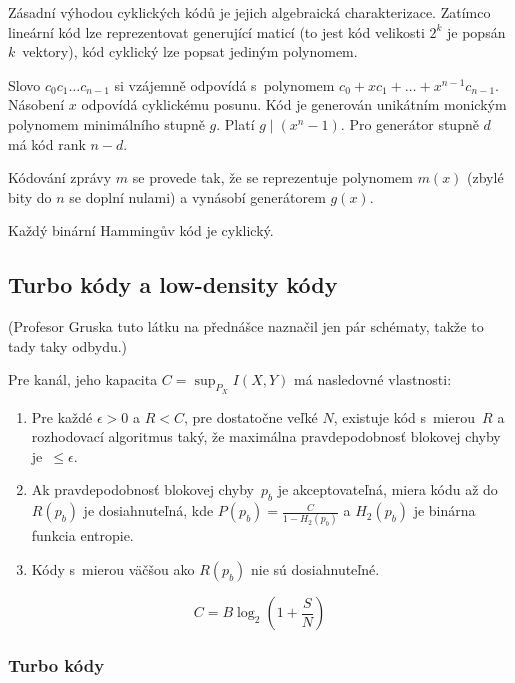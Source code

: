Zásadní výhodou cyklických kódů je jejich algebraická charakterizace.
Zatímco lineární kód lze reprezentovat generující maticí (to jest kód
velikosti $2^k$ je popsán $k$~vektory), kód cyklický lze popsat
jediným polynomem.

Slovo $c_0c_1 \ldots c_{n-1}$ si vzájemně odpovídá s~polynomem
$c_0 + x c_1 + \ldots + x^{n-1} c_{n-1}$. Násobení $x$ odpovídá
cyklickému posunu. Kód je generován unikátním monickým polynomem
minimálního stupně $g$. Platí $g \mid (x^n - 1)$.
Pro generátor stupně $d$ má kód rank $n - d$.

Kódování zprávy $m$ se provede tak, že se reprezentuje polynomem $m(x)$
(zbylé bity do $n$ se doplní nulami)
a vynásobí generátorem $g(x)$.

Každý binární Hammingův kód je cyklický.

\subsection{Turbo kódy a low-density kódy}

(Profesor Gruska tuto látku na přednášce naznačil jen pár schématy, takže
to tady taky odbydu.)

\begin{theorem}[Shannon]
	Pre kanál, jeho kapacita $C=\sup_{P_X}I(X,Y)$ má nasledovné vlastnosti:
	\begin{enumerate}
		\item Pre každé $\epsilon > 0$ a $R < C$, pre dostatočne veľké $N$, existuje
		kód s~mierou~$R$ a rozhodovací algoritmus taký, že maximálna pravdepodobnosť
		blokovej chyby je~$\leq \epsilon$.
		\item Ak pravdepodobnosť blokovej chyby~$p_b$ je akceptovateľná, miera
		kódu až do $R(p_b)$ je dosiahnuteľná, kde $P(p_b)=\frac{C}{1-H_2(p_b)}$ a
		$H_2(p_b)$ je binárna funkcia entropie.
		\item Kódy s~mierou väčšou ako $R(p_b)$ nie sú dosiahnuteľné.
	\end{enumerate}
\end{theorem}

\begin{theorem}[Shannon]
	\[ 
		C = B \log_2\left(1+\frac{S}{N}\right)
	\]
\end{theorem}

\subsubsection{Turbo kódy}


